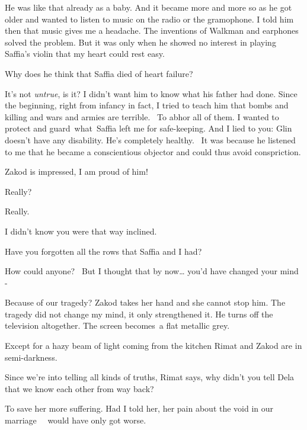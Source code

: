 \documentclass[letterpaper]{article}
\begin{document}
{\textquotedbl}He was like that already as a baby. And it became more and more so as he got older and wanted to listen
to music on the radio or the gramophone. I told him then that music gives me a headache. The inventions of Walkman and
earphones solved the problem. But it was only when he showed no interest in playing Saffia's violin that my heart could
rest easy.{\textquotedbl} 

{\textquotedbl}Why does he think that Saffia died of heart failure?{\textquotedbl} ~

{\textquotedbl}It's not\textit{ untrue}, is it? I didn't want him to know what his father had done. Since the beginning,
right from infancy in fact, I tried to teach him that bombs and killing and wars and armies are terrible.~ To abhor all
of them. I wanted to protect and guard~what~Saffia left me for safe-keeping. And I lied to you: Glin doesn't have any
disability. He's completely healthy. ~It was because he listened to me that he became a conscientious objector and
could thus avoid conspriction.{\textquotedbl}\textcolor{red}{ }

Zakod is impressed, {\textquotedbl}I am proud of him!{\textquotedbl} 

{\textquotedbl}Really?{\textquotedbl} 

{\textquotedbl}Really.{\textquotedbl}~ 

{\textquotedbl}I didn't know you were that way inclined.{\textquotedbl} 

{\textquotedbl}Have you forgotten all the rows that Saffia and I had?{\textquotedbl} 

{\textquotedbl}How could anyone? \ But I thought that by now{\dots} you'd have changed your mind -{\textquotedbl}

{\textquotedbl}Because of our tragedy?{\textquotedbl} Zakod takes her hand and she cannot stop him. {\textquotedbl}The
tragedy did not change my mind, it only strengthened it.{\textquotedbl} He turns off the television altogether. The
screen becomes~a flat metallic grey.

Except for a hazy beam of light coming\textcolor[rgb]{0.8901961,0.42352942,0.039215688}{ }from the kitchen Rimat and
Zakod are in semi-darkness. 

{\textquotedbl}Since we're into telling all kinds of truths,{\textquotedbl} Rimat says, {\textquotedbl}why didn't you
tell Dela that we know each other from way back?{\textquotedbl} 

{\textquotedbl}To save her more suffering. Had I told her, her pain about the void in our marriage \ \ would have only
got worse.{\textquotedbl} 
\end{document}
